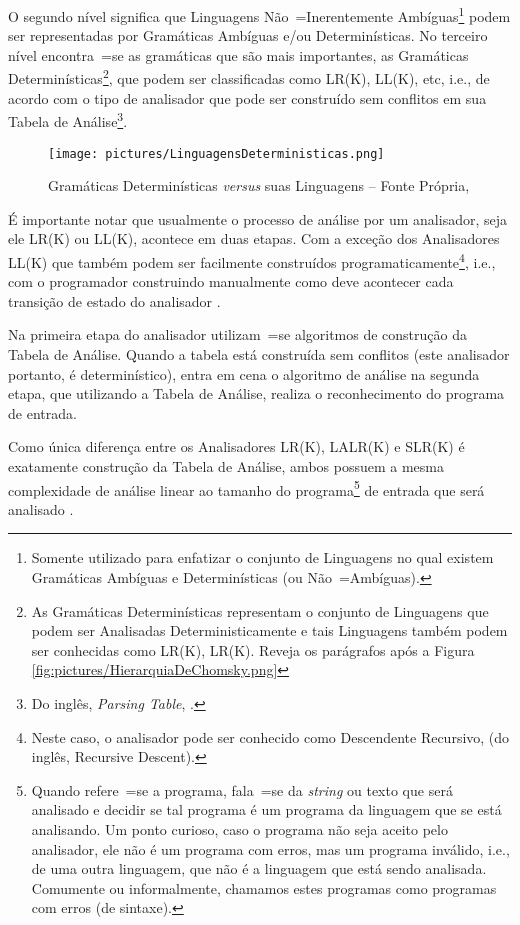 {    O segundo nível significa que Linguagens Não~=Inerentemente Ambíguas\footnote{
    Somente utilizado para enfatizar o conjunto de Linguagens no qual existem Gramáticas Ambíguas e
    Determinísticas (ou Não~=Ambíguas).
    }
    podem ser representadas por Gramáticas Ambíguas e\slash{}ou Determinísticas.
    No terceiro nível encontra~=se as gramáticas que são mais importantes,
    as Gramáticas Determinísticas\footnote{
    As Gramáticas Determinísticas representam o conjunto de Linguagens que podem ser Analisadas Deterministicamente e
    tais Linguagens também podem ser conhecidas como LR(K),
    LR(K).
    Reveja os parágrafos após a Figura \ref{fig:pictures/HierarquiaDeChomsky.png}
    },
    que podem ser classificadas como LR(K),
    LL(K), etc, i.e.,
    de acordo com o tipo de analisador que pode ser construído sem conflitos em sua Tabela de Análise\footnote{
    Do inglês, \textit{Parsing Table},
    \cite{ahoCompilerDragonBook}.
    }.
    \begin{figure}[h]
    \centering
    \texttt{[image: pictures/LinguagensDeterministicas.png]}
    \caption[Gramáticas Determinísticas \textit{versus} suas Linguagens]{Gramáticas Determinísticas \textit{versus} suas Linguagens -- Fonte Própria,
    }
    \label{fig:pictures/LinguagensDeterministicas.png}
    \end{figure}

    É importante notar que usualmente o processo de análise por um analisador,
    seja ele LR(K) ou
    LL(K),
    acontece em duas etapas.
    Com a exceção dos Analisadores LL(K) que também podem ser facilmente construídos programaticamente\footnote{
    Neste caso,
    o analisador pode ser conhecido como Descendente Recursivo,
    (do inglês,
    Recursive Descent).
    },
    i.e.,
    com o programador construindo manualmente como deve acontecer cada transição de estado do analisador \cite{ahoCompilerDragonBook}.

    Na primeira etapa do analisador utilizam~=se algoritmos de construção da Tabela de Análise.
    Quando a tabela está construída sem conflitos (este analisador portanto,
    é determinístico),
    entra em cena o algoritmo de análise na segunda etapa,
    que utilizando a Tabela de Análise,
    realiza o reconhecimento do programa de entrada.

    Como única diferença entre os Analisadores LR(K),
    LALR(K) e
    SLR(K) é exatamente construção da Tabela de Análise,
    ambos possuem a mesma complexidade de análise linear ao tamanho do programa\footnote{
    Quando refere~=se a programa,
    fala~=se da \textit{string} ou
    texto que será analisado e
    decidir se tal programa é um programa da linguagem que se está analisando.
    Um ponto curioso,
    caso o programa não seja aceito pelo analisador,
    ele não é um programa com erros,
    mas um programa inválido,
    i.e.,
    de uma outra linguagem,
    que não é a linguagem que está sendo analisada.
    Comumente ou
    informalmente,
    chamamos estes programas como programas com erros (de sintaxe).
    }
    de entrada que será analisado \cite{knuthLrParser1965,linearLL1AndLR1Grammars,generalContextFreeParsingAlgorithm}.

}
